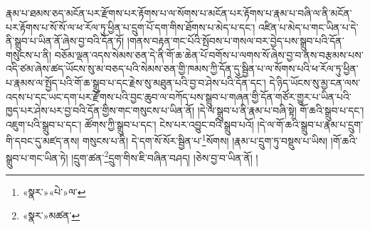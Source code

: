 རྣམ་པ་ཐམས་ཅད་མངོན་པར་རྫོགས་པར་རྟོགས་པ་ལ་སོགས་པ་མངོན་པར་རྟོགས་པ་རྣམ་པ་བཞི་ལ་ནི་མངོན་པར་རྟོགས་པ་སོ་སོ་ལ་ཕ་རོལ་ཏུ་ཕྱིན་པ་དྲུག་པོ་དག་གིས་ཐོགས་པ་མེད་པ་དང་། འཛིན་པ་མེད་པ་གང་ཡིན་པ་དེ་ནི་སྒྲུབ་པ་ཡིན་ནོ་ཞེས་བྱ་བའི་དོན་ཏོ། །གནས་བརྟན་གང་པོའི་སྤོབས་པ་གསལ་བར་བྱེད་པས་སྒྲུབ་པའི་དོན་གསུངས་པ་ནི། བཅོམ་ལྡན་འདས་སེམས་ཅན་དེ་ནི་གོ་ཆ་ཆེན་པོ་བགོས་པ་ལགས་སོ་ཞེས་བྱ་བ་ནས་བརྩམས་པས་འདི་ཙམ་ཞེས་ཚད་ཡོངས་སུ་མ་བཅད་པའི་སེམས་ཅན་གྱི་ཁམས་ཀྱི་དོན་དུ་སྦྱིན་པ་ལ་སོགས་པའི་ཕ་རོལ་ཏུ་ཕྱིན་པ་རྣམས་ལ་སྤྱོད་པའི་གོ་ཆ་སྒྲུབ་པ་དང་རྗེས་སུ་མཐུན་པའི་བྱ་བ་ཤེས་པའི་དོན་དང་། དེ་ཉིད་ཡོངས་སུ་མྱ་ངན་ལས་འདས་པ་དང་ཡང་དག་པར་རྫོགས་པའི་བྱང་ཆུབ་ལ་བཀོད་པས་སྒྲུབ་པ་གཞན་གྱི་དོན་གཙོར་གྱུར་པ་ཡིན་པའི་ཁྱད་པར་ཤེས་པར་བྱ་བའི་དོན་གྱིས་གང་གསུངས་པ་ཡིན་ནོ། །དེ་ལ་སྒྲུབ་པ་ནི་རྣམ་པ་བཞི་སྟེ། གོ་ཆའི་སྒྲུབ་པ་དང་། འཇུག་པའི་སྒྲུབ་པ་དང་། ཚོགས་ཀྱི་སྒྲུབ་པ་དང་། ངེས་པར་འབྱུང་བའི་སྒྲུབ་པའོ། །དེ་ལ་གོ་ཆའི་སྒྲུབ་པ་རྣམ་པ་དྲུག་གི་དབང་དུ་མཛད་ནས། གསུངས་པ་ནི། དེ་དག་སོ་སོར་སྦྱིན་པ་\footnote{«སྣར་»«པེ་»ལ་}སོགས། །རྣམ་པ་དྲུག་ཏུ་བསྡུས་པ་ཡིས། །གོ་ཆའི་སྒྲུབ་པ་གང་ཡིན་ཏེ། །དྲུག་ཚན་\footnote{«སྣར་»མཚན་}དྲུག་གིས་ཇི་བཞིན་བཤད། །ཅེས་བྱ་བ་ཡིན་ནོ། །
